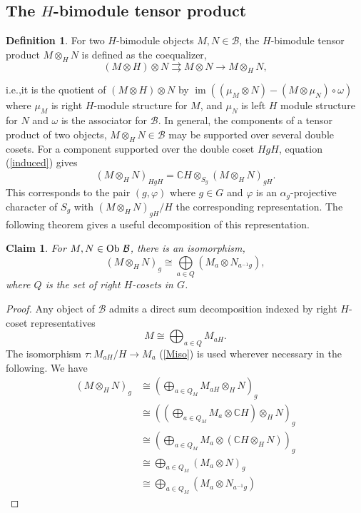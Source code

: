 \documentclass[11pt]{book}
\newtheorem{Claim}[theorem]{Claim}
\theoremstyle{Rem}
\theoremstyle{definition}
\newtheorem{Def}[theorem]{Definition}
\numberwithin{equation}{section}
\newcommand\inv{^{-1}}
\newcommand{\ie}{i.e.,}
\newcommand\Ob{\textnormal{Ob }}
\newcommand\Img{\operatorname{im}}
\newcommand\CC{\mathbb C}
\newcommand\B{\mathcal B}
\begin{document}
\subsection{The $H$-bimodule tensor product} 
\begin{Def}
For two $H$-bimodule objects $M, N\in \B$, the $H$-bimodule tensor product $M\otimes_H N$  is defined as the coequalizer, \begin{equation}
	(M\otimes H) \otimes N  \rightrightarrows M\otimes N \rightarrow M\otimes_H N,
\end{equation}
\end{Def}
\ie  it is the quotient of $(M\otimes H)\otimes N$ by $\Img((\mu_M \otimes N)- (M\otimes \mu_N)\circ\omega)$ where $\mu_M$ is right $H$-module structure for $M$, and $\mu_N$ is left $H$ module structure for $N$ and $\omega$ is the associator for $\B$. In general, the components of a tensor product of two objects, $M\otimes_H N\in \B$ may be supported over several double cosets. For a component supported over the double coset $HgH$, equation (\ref{induced}) gives
\begin{equation}\label{tensor}
	(M\otimes_H N)_{HgH} = \CC H \otimes_{S_g} (M\otimes_H N)_{gH}.
\end{equation}
This corresponds to the pair $(g, \varphi)$ where $g\in G$ and $\varphi$ is an $\alpha_g$-projective character of $S_g$ with $(M\otimes_H N)_{gH}/H$ the corresponding representation. The following theorem gives a useful decomposition of this representation. \begin{Claim}
For  $M,N \in \Ob \B$, there is an isomorphism, \begin{equation}
 (M\otimes_H N)_g \cong \underset{a\in Q}\bigoplus (M_a \otimes N_{a\inv g}),\label{decomp}
\end{equation}
where $Q$ is the set of right $H$-cosets in $G$.
\end{Claim}
\begin{proof}
Any object of $\B$ admits a direct sum decomposition indexed by right $H$-coset representatives \begin{equation}
	M\cong\bigoplus_{a\in Q} M_{aH}.
\end{equation} 
The isomorphism $\tau: M_{aH}/H \rightarrow M_a$ (\ref{Miso}) is used wherever necessary in the following. We have
\begin{align}
 (M\otimes_H N)_g \label{iso1}&\cong(\bigoplus_{a\in Q_M} M_{aH}\otimes_H N)_g\\
&\cong((\bigoplus_{a\in Q_M} M_a \otimes \CC H) \otimes_H N)_g
\\&\cong(\bigoplus_{a\in Q_M} M_a \otimes (\CC H \otimes_H N))_g\label{nontriv}\\
 &\cong \bigoplus_{a\in Q_M}( M_a \otimes N)_g \\
&\cong \bigoplus_{a\in Q_M}( M_a \otimes N_{a\inv g})\label{bimodproductlast} \end{align} \end{proof} 
\end{document}
